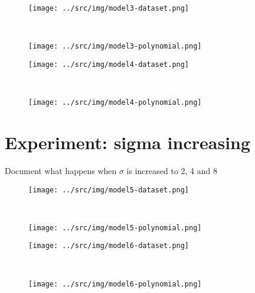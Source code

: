 \documentclass[a4paper,12pt]{article} %
\begin{document}
	\begin{figure}[H]
		\begin{minipage}[c]{.5\textwidth}
			\centering
			\texttt{[image: ../src/img/model3-dataset.png]}
			\label{fig:model3-dataset}
		\end{minipage}
		~
		\begin{minipage}[c]{.5\textwidth}
			\centering
			\texttt{[image: ../src/img/model3-polynomial.png]}
			\label{fig:model3-polynomial}
		\end{minipage}
	\end{figure}
	
	\begin{figure}[H]
		\begin{minipage}[c]{.5\textwidth}
			\centering
			\texttt{[image: ../src/img/model4-dataset.png]}
			\label{fig:model4-dataset}
		\end{minipage}
		~
		\begin{minipage}[c]{.5\textwidth}
			\centering
			\texttt{[image: ../src/img/model4-polynomial.png]}
			\label{fig:model4-polynomial}
		\end{minipage}
	\end{figure}
	
	\section{Experiment: sigma increasing}
	
	Document what happens when $\sigma$ is increased to 2, 4 and 8
	
	\begin{figure}[H]
		\begin{minipage}[c]{.5\textwidth}
			\centering
			\texttt{[image: ../src/img/model5-dataset.png]}
			\label{fig:model5-dataset}
		\end{minipage}
		~
		\begin{minipage}[c]{.5\textwidth}
			\centering
			\texttt{[image: ../src/img/model5-polynomial.png]}
			\label{fig:model5-polynomial}
		\end{minipage}
	\end{figure}
	
	\begin{figure}[H]
		\begin{minipage}[c]{.5\textwidth}
			\centering
			\texttt{[image: ../src/img/model6-dataset.png]}
			\label{fig:model6-dataset}
		\end{minipage}
		~
		\begin{minipage}[c]{.5\textwidth}
			\centering
			\texttt{[image: ../src/img/model6-polynomial.png]}
			\label{fig:model6-polynomial}
		\end{minipage}
	\end{figure}
	
\end{document}
